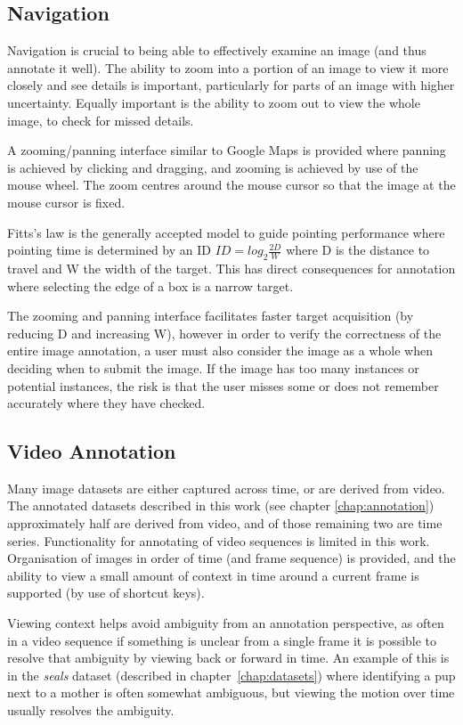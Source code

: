 \subsection {Navigation}

Navigation is crucial to being able to effectively examine an image (and thus annotate it well). The ability to zoom into a portion of an image to view it more closely and see details is important,  particularly  for parts of an image with higher uncertainty. Equally important is the ability to zoom out to view the whole image, to check for missed details. 

A zooming/panning interface similar to Google Maps is provided where panning is achieved by clicking and dragging, and zooming is achieved by use of the mouse wheel. The zoom centres around the mouse cursor so that the image at the mouse cursor is fixed.

Fitts's law is the generally accepted model to guide pointing performance where pointing time is determined by an \gls{ID} $ ID = log_2 \frac{2D}{W} $ where D is the distance to travel and W the width of the target. This has direct consequences for annotation where selecting the edge of a box is a narrow target. 

The zooming and panning interface facilitates faster target acquisition (by reducing D and increasing W), however in order to verify the correctness of the entire image annotation, a user must also consider the image as a whole when deciding when to submit the image. If the image has too many instances or potential instances, the risk is that the user misses some or does not remember accurately where they have checked. 



\subsection {Video Annotation}

Many image datasets are either captured across time, or are derived from video. The annotated datasets described in this work (see chapter \ref{chap:annotation})  approximately half are derived from video, and of those remaining two are time series. Functionality for annotating of video sequences is limited in this work. Organisation of images in order of time (and frame sequence) is provided, and the ability to view a small amount of context in time around a current frame is supported (by use of shortcut keys).

Viewing context helps avoid ambiguity from an annotation perspective, as often in a video sequence if something is unclear from a single frame it is possible to resolve that ambiguity by viewing back or forward in time. An example of this is in the \emph{seals} dataset (described in chapter~\ref{chap:datasets}) where identifying a pup next to a mother is often somewhat ambiguous, but viewing the motion over time usually resolves the ambiguity.

